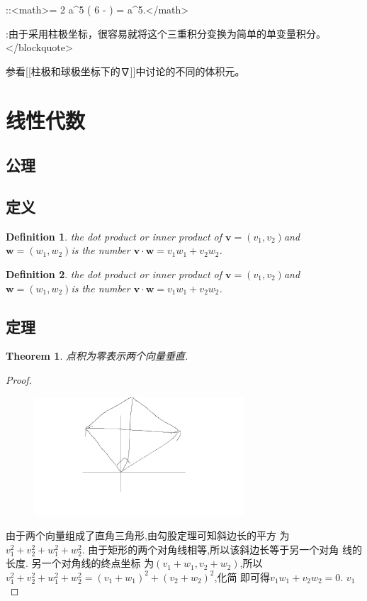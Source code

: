 \documentclass[UTF-8]{ctexart}
\newtheorem{definition}{Definition}[section]
\newtheorem{theorem}{Theorem}[section]
\newtheorem{proof}{Proof}[section]
\begin{document}
::<math>= 2  \pi a^5 \left ( 6 -  \right ) =  a^5.</math>

:由于采用柱极坐标，很容易就将这个三重积分变换为简单的单变量积分。</blockquote>

参看[[柱极和球极坐标下的∇]]中讨论的不同的体积元。


\section{线性代数}

\subsection{公理}
\subsection{定义}
\begin{definition}
  the dot product or inner product of $\mathbf{v}
=(v_1,v_2)$and$\mathbf{w}=(w_1,w_2)$is the number $\mathbf{v} \cdot \mathbf{w} = v_1w_1+v_2w_2$.

\end{definition}
\begin{definition}
  the dot product or inner product of $\mathbf{v}
=(v_1,v_2)$and$\mathbf{w}=(w_1,w_2)$is the number $\mathbf{v} \cdot \mathbf{w} = v_1w_1+v_2w_2$.

\end{definition}


\subsection{定理}
\begin{theorem}
  点积为零表示两个向量垂直.

\end{theorem}


\begin{proof}
  \begin{figure}[H] %
    \centering %
    \includegraphics[width=0.7\textwidth]{images/math/1.jpg} %
  \end{figure}
  由于两个向量组成了直角三角形,由勾股定理可知斜边长的平方
  为$v_1^2+v_2^2+w_1^2+w_2^2$. 由于矩形的两个对角线相等,所以该斜边长等于另一个对角
  线的长度. 另一个对角线的终点坐标
  为$(v_1+w_1,v_2+w_2)$,所以$v_1^2+v_2^2+w_1^2+w_2^2=(v_1+w_1)^2+(v_2+w_2)^2$,化简
  即可得$v_1w_1+v_2w_2=0$. $v_1$	
\end{proof}
\end{document}
